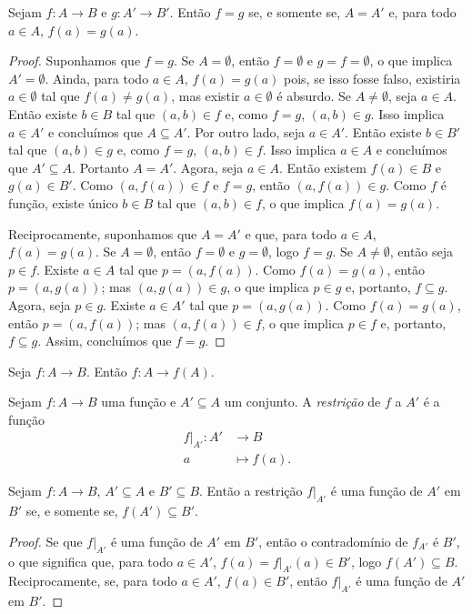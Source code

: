 \begin{prop}\label{conj:prop.func.ig}
	Sejam $f: A \to B$ e $g:A' \to B'$. Então $f=g$ se, e somente se, $A=A'$ e, para todo $a \in A$, $f(a)=g(a)$.
\end{prop}
\begin{proof}
	Suponhamos que $f=g$. Se $A=\emptyset$, então $f=\emptyset$ e $g=f=\emptyset$, o que implica $A'=\emptyset$. Ainda, para todo $a \in A$, $f(a)=g(a)$ pois, se isso fosse falso, existiria $a \in \emptyset$ tal que $f(a)\neq g(a)$, mas existir $a \in \emptyset$ é absurdo. Se $A \neq \emptyset$, seja $a \in A$. Então existe $b \in B$ tal que $(a,b) \in f$ e, como $f=g$, $(a,b) \in g$. Isso implica $a \in A'$ e concluímos que $A \subseteq A'$. Por outro lado, seja $a \in A'$. Então existe $b \in B'$ tal que $(a,b) \in g$ e, como $f=g$, $(a,b) \in f$. Isso implica $a \in A$ e concluímos que $A' \subseteq A$. Portanto $A=A'$. Agora, seja $a \in A$. Então existem $f(a) \in B$ e $g(a) \in B'$. Como $(a,f(a)) \in f$ e $f=g$, então $(a,f(a)) \in g$. Como $f$ é função, existe único $b \in B$ tal que $(a,b) \in f$, o que implica $f(a)=g(a)$.
	
	Reciprocamente, suponhamos que $A=A'$ e que, para todo $a \in A$, $f(a)=g(a)$. Se $A=\emptyset$, então $f=\emptyset$ e $g=\emptyset$, logo $f=g$. Se $A \neq \emptyset$, então seja $p \in f$. Existe $a \in A$ tal que $p=(a,f(a))$. Como $f(a)=g(a)$, então $p=(a,g(a))$; mas $(a,g(a)) \in g$, o que implica $p \in g$ e, portanto, $f \subseteq g$. Agora, seja $p \in g$. Existe $a \in A'$ tal que $p=(a,g(a))$. Como $f(a)=g(a)$, então $p=(a,f(a))$; mas $(a,f(a)) \in f$, o que implica $p \in f$ e, portanto, $f \subseteq g$. Assim, concluímos que $f=g$.
\end{proof}

\begin{prop}
	Seja $f: A \to B$. Então $f: A \to f(A)$.
\end{prop}

\begin{defi}
	Sejam $f: A \to B$ uma função e $A' \subseteq A$ um conjunto. A \emph{restrição} de $f$ a $A'$ é a função
	\begin{align*}
	f|_{A'} : A' &\to B \\
				a &\mapsto f(a).
	\end{align*}
\end{defi}

\begin{prop}\label{conj:prop.func.rest.ig}
	Sejam $f: A \to B$, $A' \subseteq A$ e $B' \subseteq B$. Então a restrição $f|_{A'}$ é uma função de $A'$ em $B'$ se, e somente se, $f(A') \subseteq B'$.
\end{prop}
\begin{proof}
	Se que $f|_{A'}$ é uma função de $A'$ em $B'$, então o contradomínio de $f_{A'}$ é $B'$, o que significa que, para todo $a \in A'$, $f(a) = f|_{A'}(a) \in B'$, logo $f(A') \subseteq B$. Reciprocamente, se, para todo $a \in A'$, $f(a) \in B'$, então $f|_{A'}$ é uma função de $A'$ em $B'$.
\end{proof}


